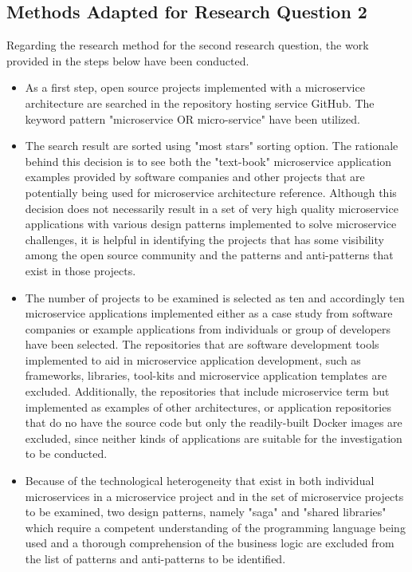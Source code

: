 \documentclass{Configuration_Files/PoliMi3i_thesis}
\begin{document}
\subsection{Methods Adapted for Research Question 2}
\label{subsec:adopted_method_RQ2}

Regarding the research method for the second research question, the work provided in the steps below have been conducted.

\begin{itemize}
    \item As a first step, open source projects implemented with a microservice architecture are searched in the repository hosting service GitHub.
    The keyword pattern "microservice OR micro-service" have been utilized.

    \item The search result are sorted using "most stars" sorting option.
    The rationale behind this decision is to see both the "text-book" microservice application examples provided by software companies and other projects that are potentially being used for microservice architecture reference.
    Although this decision does not necessarily result in a set of very high quality microservice applications with various design patterns implemented to solve microservice challenges, it is helpful in identifying the projects that has some visibility among the open source community and the patterns and anti-patterns that exist in those projects.
    
    \item The number of projects to be examined is selected as ten and accordingly ten microservice applications implemented either as a case study from software companies or example applications from individuals or group of developers have been selected.
    The repositories that are software development tools implemented to aid in microservice application development, such as frameworks, libraries, tool-kits and microservice application templates are excluded.
    Additionally, the repositories that include microservice term but implemented as examples of other architectures, or application repositories that do no have the source code but only the readily-built Docker images are excluded, since neither kinds of applications are suitable for the investigation to be conducted.
    
    \item Because of the technological heterogeneity that exist in both individual microservices in a microservice project and in the set of microservice projects to be examined, two design patterns, namely "saga" and "shared libraries" which require a competent understanding of the programming language being used and a thorough comprehension of the business logic are excluded from the list of patterns and anti-patterns to be identified.
    

\end{itemize}
\end{document}
